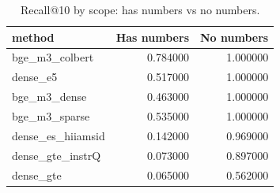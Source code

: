 \begin{table}
\caption{Recall@10 by scope: has numbers vs no numbers.}
\label{tab:recall10}
\begin{tabular}{lrr}
\toprule
method & Has numbers & No numbers \\
\midrule
bge_m3_colbert & 0.784000 & 1.000000 \\
dense_e5 & 0.517000 & 1.000000 \\
bge_m3_dense & 0.463000 & 1.000000 \\
bge_m3_sparse & 0.535000 & 1.000000 \\
dense_es_hiiamsid & 0.142000 & 0.969000 \\
dense_gte_instrQ & 0.073000 & 0.897000 \\
dense_gte & 0.065000 & 0.562000 \\
\bottomrule
\end{tabular}
\end{table}
